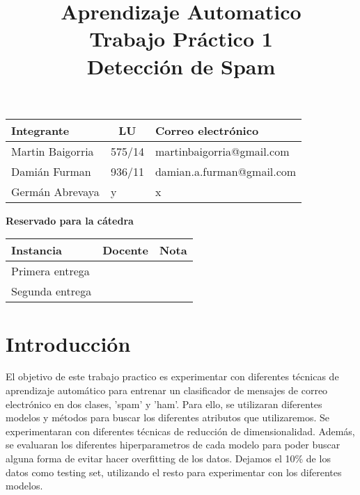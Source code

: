 \documentclass[10pt,a4paper]{article}
\title{Aprendizaje Automatico \\ Trabajo Práctico 1 \\ Detección de Spam }
\begin{document}

\maketitle

\bigskip

\begin{table}[h]
\centering
\begin{tabular}{|l l l|}
\hline
Integrante       & \multicolumn{1}{c}{LU}     & Correo electrónico        \\ \hline
Martin Baigorria & \multicolumn{1}{c}{575/14} & martinbaigorria@gmail.com \\ 
Damián Furman & 	936/11                      & damian.a.furman@gmail.com \\
Germán Abrevaya & y                      & x \\ \hline
\end{tabular}
\end{table}

\vfill

\begin{center}
\textbf{Reservado para la cátedra}
\end{center}
\begin{table}[h]
\centering
\begin{tabular}{|l|l|l|}
\hline
Instancia       & Docente & Nota \\ \hline
Primera entrega &         &      \\ \hline
Segunda entrega &         &      \\ \hline
\end{tabular}
\end{table}

\newpage
\tableofcontents
\newpage


\section{Introducción}

El objetivo de este trabajo practico es experimentar con diferentes técnicas de aprendizaje automático para entrenar un clasificador de mensajes de correo electrónico en dos clases, 'spam' y 'ham'. Para ello, se utilizaran diferentes modelos y métodos para buscar los diferentes atributos que utilizaremos. Se experimentaran con diferentes técnicas de reducción de dimensionalidad. Además, se evaluaran los diferentes hiperparametros de cada modelo para poder buscar alguna forma de evitar hacer overfitting de los datos. Dejamos el 10\% de los datos como testing set, utilizando el resto para experimentar con los diferentes modelos.
\end{document}
